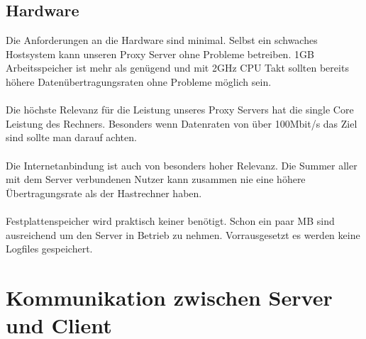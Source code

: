 \subsection{Hardware}
Die Anforderungen an die Hardware sind minimal. Selbst ein schwaches Hostsystem kann unseren  Proxy Server ohne Probleme betreiben. 1GB Arbeitsspeicher ist mehr als genügend und mit 2GHz CPU Takt sollten bereits höhere Datenübertragungsraten ohne Probleme möglich sein. 
\\\\ 
Die höchste Relevanz für die Leistung unseres Proxy Servers hat die single Core Leistung des Rechners. Besonders wenn Datenraten von über 100Mbit/s das Ziel sind sollte man darauf achten.
\\\\
Die Internetanbindung ist auch von besonders hoher Relevanz. Die Summer aller mit dem Server verbundenen Nutzer kann zusammen nie eine höhere Übertragungsrate als der Hastrechner haben. 
\\\\
Festplattenspeicher wird praktisch keiner benötigt. Schon ein paar MB sind ausreichend um den Server in Betrieb zu nehmen. Vorrausgesetzt es werden keine Logfiles gespeichert.


\section{Kommunikation zwischen Server und Client}
